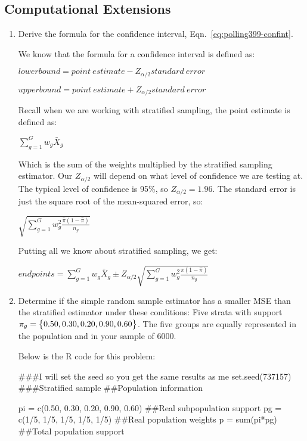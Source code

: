 \begin{enumerate}
\end{enumerate}




\subsection*{Computational Extensions}
\begin{enumerate}

 \item Derive the formula for the confidence interval, Eqn.~\ref{eq:polling399-confint}.
\begin{solution}
We know that the formula for a confidence interval is defined as: 

$lower bound = point \: estimate - Z_{\alpha/2} standard \: error$

$upper bound = point \: estimate + Z_{\alpha/2} standard \: error$

Recall when we are working with stratified sampling, the point estimate is defined as:

$ \sum_{g = 1}^{G} w_{g} \bar{X}_{g}$

Which is the sum of the weights multiplied by the stratified sampling estimator. Our $Z_{\alpha/2}$ will depend on what level of confidence we are testing at. The typical level of confidence is 95\%, so $Z_{\alpha/2} = 1.96$. The standard error is just the square root of the mean-squared error, so:

$\sqrt{\sum_{g = 1}^{G} w^{2}_{g} \frac{\hat{\pi} (1 - \hat{\pi})}{n_{g}}}$

Putting all we know about stratified sampling, we get: 

$ endpoints = \sum_{g = 1}^{G} w_{g} \bar{X}_{g} \pm Z_{\alpha/2}  \sqrt{\sum_{g = 1}^{G} w^{2}_{g} \frac{\hat{\pi} (1 - \hat{\pi})}{n_{g}}}$
\end{solution}

 \item Determine if the simple random sample estimator has a smaller MSE than the stratified estimator under these conditions: Five strata with support $\pi_g = \big\{0.50, 0.30, 0.20, 0.90, 0.60\big\}$. The five groups are equally represented in the population and in your sample of 6000.
\begin{solution}
Below is the R code for this problem:
\begin{codein}
###I will set the seed so you get the same results as me
set.seed(737157)
###Stratified sample
##Population information

pi = c(0.50, 0.30, 0.20, 0.90, 0.60) ##Real subpopulation support
pg = c(1/5, 1/5, 1/5, 1/5, 1/5) ##Real population weights
p = sum(pi*pg) ##Total population support


\end{codein}
\end{solution}
\end{enumerate}
